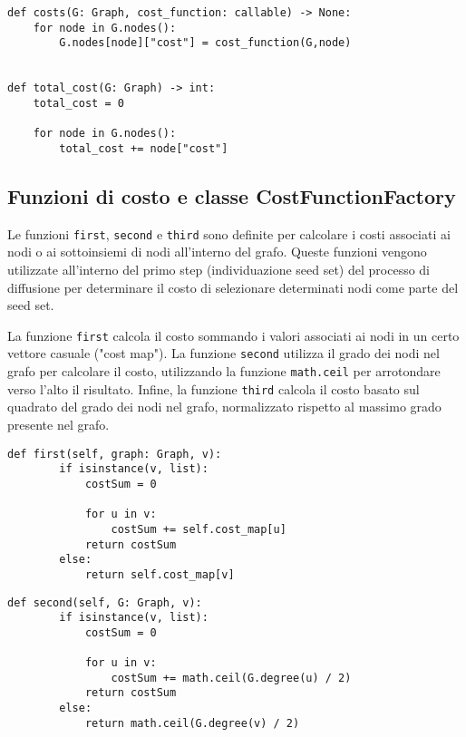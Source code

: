 \begin{code}
\begin{verbatim}
def costs(G: Graph, cost_function: callable) -> None:
    for node in G.nodes():
        G.nodes[node]["cost"] = cost_function(G,node)


def total_cost(G: Graph) -> int:
    total_cost = 0
    
    for node in G.nodes():
        total_cost += node["cost"]
\end{verbatim}
\end{code}

\subsection{Funzioni di costo e classe CostFunctionFactory}

Le funzioni \texttt{first}, \texttt{second} e \texttt{third} sono definite per calcolare i costi associati ai nodi o ai sottoinsiemi di nodi all'interno del grafo. Queste funzioni vengono utilizzate all'interno del primo step (individuazione seed set) del processo di diffusione per determinare il costo di selezionare determinati nodi come parte del seed set.

La funzione \texttt{first} calcola il costo sommando i valori associati ai nodi in un certo vettore casuale ("cost map"). La funzione \texttt{second} utilizza il grado dei nodi nel grafo per calcolare il costo, utilizzando la funzione \texttt{math.ceil} per arrotondare verso l'alto il risultato. Infine, la funzione \texttt{third} calcola il costo basato sul quadrato del grado dei nodi nel grafo, normalizzato rispetto al massimo grado presente nel grafo.

\begin{code}
\begin{verbatim}
def first(self, graph: Graph, v):
        if isinstance(v, list):
            costSum = 0

            for u in v:
                costSum += self.cost_map[u]
            return costSum
        else:
            return self.cost_map[v]
\end{verbatim}
\end{code}

\begin{code}
\begin{verbatim}
def second(self, G: Graph, v):
        if isinstance(v, list):
            costSum = 0

            for u in v:
                costSum += math.ceil(G.degree(u) / 2)
            return costSum
        else:
            return math.ceil(G.degree(v) / 2)
\end{verbatim}
\end{code}

